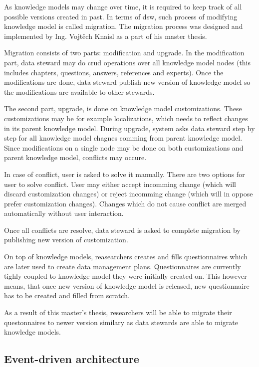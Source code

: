 As knowledge models may change over time, it is required to keep track of all possible versions created in past.
In terms of \gls{dsw}, such process of modifying knowledge model is called migration.
The migration process was designed and implemented by Ing. Vojtěch Knaisl as a part of his master thesis\cite{mt-knaisl}.

Migration consists of two parts: modification and upgrade.
In the modification part, data steward may do \gls{crud} operations over all knowledge model nodes (this includes chapters, questions, answers, references and experts).
Once the modifications are done, data steward publish new version of knowledge model so the modifications are available to other stewards.

The second part, upgrade, is done on knowledge model customizations.
These customizations may be for example localizations, which needs to reflect changes in its parent knowledge model.
During upgrade, system asks data steward step by step for all knowledge model chagnes comming from parent knowledge model.
Since modifications on a single node may be done on both customizations and parent knowledge model, conflicts may occure.

In case of conflict, user is asked to solve it manually.
There are two options for user to solve conflict.
User may either accept incomming change (which will discard customization changes) or reject incomming change (which will in oppose prefer customization changes).
Changes which do not cause conflict are merged automatically without user interaction.

Once all conflicts are resolve, data steward is asked to complete migration by publishing new version of customization.

On top of knowledge models, reasearchers creates and fills questionnaires which are later used to create data management plans.
Questionnaires are currently tighly coupled to knowledge model they were initially created on.
This however means, that once new version of knowledge model is released, new questionnaire has to be created and filled from scratch.

As a result of this master's thesis, researchers will be able to migrate their questonnaires to newer version similary as data stewards are able to migrate knowledge models.

\subsection{Event-driven architecture}

